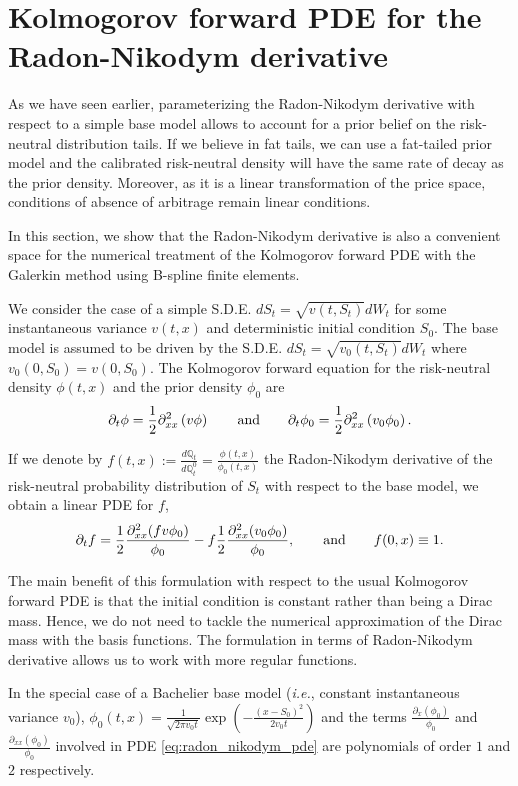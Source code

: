 \documentclass[a4paper]{article}
\newcommand{\1}{\textbf{1}}
\newcommand{\Q}{\mathbb{Q}}
\begin{document}
\section{Kolmogorov forward PDE for the Radon-Nikodym derivative}\label{sec:kolmo_radon_nikodym} 
\par As we have seen earlier, parameterizing the Radon-Nikodym derivative with respect to a simple base model allows to account for a prior belief on the risk-neutral distribution tails. If we believe in fat tails, we can use a fat-tailed prior model and the calibrated risk-neutral density will have the same rate of decay as the prior density. Moreover, as it is a linear transformation of the price space, conditions of absence of arbitrage remain linear conditions. 
\par In this section, we show that the Radon-Nikodym derivative is also a convenient space for the numerical treatment of the Kolmogorov forward PDE with the Galerkin method using B-spline finite elements. 
\par We consider the case of a simple S.D.E. $dS_t = \sqrt{v(t,S_t)} dW_t$ for some instantaneous variance $v(t,x)$ and deterministic initial condition $S_0$. The base model is assumed to be driven by the S.D.E. $dS_t = \sqrt{v_0(t,S_t)} dW_t$ where $v_0(0, S_0) = v(0, S_0)$. 
The Kolmogorov forward equation for the risk-neutral density $\phi(t, x)$ and the prior density $\phi_0$ are
$$
\partial_t \phi = \frac{1}{2} \partial^2_{xx} \left(v \phi\right) \qquad \textnormal{and} \qquad \partial_t \phi_0 = \frac{1}{2} \partial^2_{xx} \left(v_0 \phi_0 \right).
$$
\par \noindent If we denote by $f(t, x) := \frac{d\Q_t}{d\Q^0_t} = \frac{\phi(t,x)}{\phi_0(t, x)}$ the Radon-Nikodym derivative of the risk-neutral probability distribution of $S_t$ with respect to the base model, we obtain a linear PDE for $f$,
\begin{equation}\label{eq:radon_nikodym_pde}
\partial_t f = \frac{1}{2} \frac{\partial^2_{xx} (f v \phi_0)}{\phi_0} - f \frac{1}{2} \frac{\partial^2_{xx} (v_0 \phi_0)}{\phi_0}, \qquad \textnormal{and} \qquad f(0, x) \equiv 1. 
\end{equation}
\par The main benefit of this formulation with respect to the usual Kolmogorov forward PDE is that the initial condition is constant rather than being a Dirac mass. Hence, we do not need to tackle the numerical approximation of the Dirac mass with the basis functions. The formulation in terms of Radon-Nikodym derivative allows us to work with more regular functions. 
\par In the special case of a Bachelier base model (\textit{i.e.}, constant instantaneous variance $v_0$), $\phi_0(t,x) = \frac{1}{\sqrt{2 \pi v_0 t}} \exp\left( -\frac{(x - S_0)^2}{2 v_0 t} \right)$ and the terms $\frac{\partial_x (\phi_0)}{\phi_0}$ and $\frac{\partial_{xx} (\phi_0)}{\phi_0}$ involved in PDE \eqref{eq:radon_nikodym_pde} are polynomials of order $1$ and $2$ respectively. 
\end{document}
